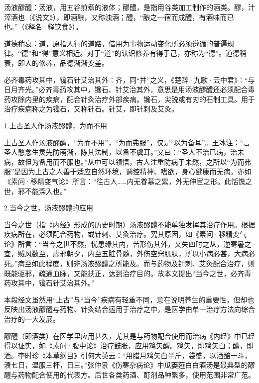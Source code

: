 \documentclass[draft,12pt]{ctexbook}
\begin{document}

\begin{jiaozhu}
	\item 汤液醪醴：汤液，用五谷煎煮的液体；醪醴，是指用谷类加工制作的酒类。醪，汁滓酒也（《说文》），即酒酿，又称浊酒；醴，“酿之一宿而成醴，有酒味而已也。”（《释名·释饮食》）。
	\item 道德稍衰：道，原指人行的道路，借用为事物运动变化所必须遵循的普遍规律。“德”和“得”意义相近。对于“道”的认识修养有得于己，亦称为“德”。道德稍衰，即人的修养，品德渐渐变差。
	\item 必齐毒药攻其中，镵石针艾治其外：齐，同“并”之义，《楚辞·九歌·云中君》：“与日月齐光。”必齐毒药攻其中，镵石、针艾治其外，意思是用汤液醪醴还必须配合毒药攻除内里的疾病，配合针灸治疗外部疾病。镵石，尖锐或有刃的石制工具。用于治疗疾病称之为镵石，又称针石。针艾，即针刺及艾灸。
\end{jiaozhu}


1.上古圣人作汤液醪醴，为而不用

上古圣人作汤液醪醴，“为而不用”，“为而弗服”，仅是“以为备耳”。王冰注：“言圣人愍念生灵先防萌渐，陈其法制，以备不虞耳。”又曰：“圣人不治已病，治未病，故但为备用而不服也。”从中可以领悟，古人注重防病于未然，之所以“为而弗服”是因为上古之人善于适应自然环境，调控精神、嗜欲，身心健康而无病。亦如《素问·移精变气论》所言：“往古人……内无眷慕之累，外无伸宦之形。此恬憺之世，邪不能深入也。”

2.当今之世，汤液醪醴的应用

当今之世（指《内经》形成的历史时期）汤液醪醴不能单独发挥其治疗作用。根据疾病所在，必须配合药物，或针刺、艾灸治疗。究其原因，如《素问·移精变气论》所言：“当今之世不然，忧患缘其内，苦形伤其外，又失四时之从，逆寒暑之宜，贼风数至，虚邪朝夕，内至五脏骨髓，外伤空窍肌肤，所以小病必甚，大病必死。”病至如此程度，则非汤液醪醴之所能及。而与药物及针刺、艾灸配合治疗，则既能驱邪，疏通血脉，又能扶正，达到治疗目的。故本文提出“当今之世，必齐毒药攻其中，镵石针艾治其外。”

本段经文虽然用“上古”与“当今”疾病有轻重不同，意在说明养生的重要性，但却也反映出汤液醪醴与药物、针灸结合运用于治疗之中，是医学由单一治疗方法向综合治疗的一大发展。



醪醴（即酒类）在医学里应用甚久，尤其是与药物配合使用而治病《内经》中已经得以证实，如《素问·腹中论》治疗鼓胀，应用鸡矢醴。鸡矢，即鸡矢白；醴，即酒。李时珍《本草纲目》引何大英云：“用腊月鸡矢白半斤，袋盛，以酒醅一斗，渍七日，温服三杯，日三。”张仲景《伤寒杂病论》中瓜蒌薤白白酒汤是最典型的醪醴与药物配合使用的代表方。后世各类药酒、酊剂品种繁多，使用范围非常广范。
\end{document}
